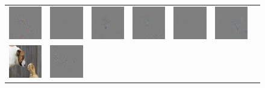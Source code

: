 \begin{figure}
\begin{center}
\begin{tabular}{ccccccc}
\includegraphics[width=0.14\linewidth,height=0.115\linewidth]{figs/examples/googlenet/oxford/dog-cat3_diff_188} &
\includegraphics[width=0.14\linewidth,height=0.115\linewidth]{figs/examples/googlenet/deconv/dog-cat3_diff_188} &
\includegraphics[width=0.14\linewidth,height=0.115\linewidth]{figs/examples/googlenet/soft/dog-cat3_diff_188} &
\includegraphics[width=0.14\linewidth,height=0.115\linewidth]{figs/examples/googlenet/oxford/dog-cat3_diff_286} &
\includegraphics[width=0.14\linewidth,height=0.115\linewidth]{figs/examples/googlenet/deconv/dog-cat3_diff_286} &
\includegraphics[width=0.14\linewidth,height=0.115\linewidth]{figs/examples/googlenet/soft/dog-cat3_diff_286} \\
\vspace{-2.5pt}
\includegraphics[width=0.14\linewidth,height=0.115\linewidth]{figs/examples/googlenet/oxford/dog-cat4} &
\includegraphics[width=0.14\linewidth,height=0.115\linewidth]{figs/examples/googlenet/oxford/dog-cat4_diff_243} &

\end{tabular}
\end{center}
\end{figure}
